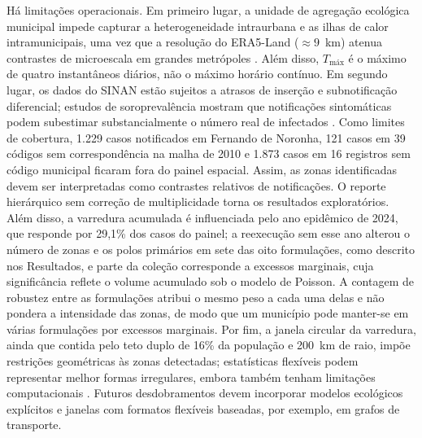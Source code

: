 Há limitações operacionais. Em primeiro lugar, a unidade de agregação ecológica municipal impede capturar a heterogeneidade intraurbana e as ilhas de calor intramunicipais, uma vez que a resolução do ERA5-Land ($\approx 9$~km) atenua contrastes de microescala em grandes metrópoles \cite{rodrigues2018}. Além disso, $T_{\text{máx}}$ é o máximo de quatro instantâneos diários, não o máximo horário contínuo. Em segundo lugar, os dados do SINAN estão sujeitos a atrasos de inserção e subnotificação diferencial; estudos de soroprevalência mostram que notificações sintomáticas podem subestimar substancialmente o número real de infectados \cite{perisse2020soroprevalencia}. Como limites de cobertura, 1.229 casos notificados em Fernando de Noronha, 121 casos em 39 códigos sem correspondência na malha de 2010 e 1.873 casos em 16 registros sem código municipal ficaram fora do painel espacial. Assim, as zonas identificadas devem ser interpretadas como contrastes relativos de notificações. O reporte hierárquico sem correção de multiplicidade torna os resultados exploratórios. Além disso, a varredura acumulada é influenciada pelo ano epidêmico de 2024, que responde por 29,1\% dos casos do painel; a reexecução sem esse ano alterou o número de zonas e os polos primários em sete das oito formulações, como descrito nos Resultados, e parte da coleção corresponde a excessos marginais, cuja significância reflete o volume acumulado sob o modelo de Poisson. A contagem de robustez entre as formulações atribui o mesmo peso a cada uma delas e não pondera a intensidade das zonas, de modo que um município pode manter-se em várias formulações por excessos marginais. Por fim, a janela circular da varredura, ainda que contida pelo teto duplo de 16\% da população e 200~km de raio, impõe restrições geométricas às zonas detectadas; estatísticas flexíveis podem representar melhor formas irregulares, embora também tenham limitações computacionais \cite{tango2005flexible}. Futuros desdobramentos devem incorporar modelos ecológicos explícitos e janelas com formatos flexíveis baseadas, por exemplo, em grafos de transporte.

